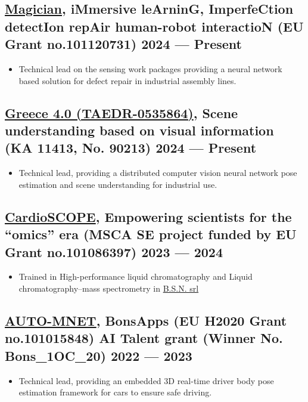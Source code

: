 \documentclass[a4,8pt]{article}
\newenvironment{zitemize}{
\begin{itemize}\itemsep0pt \parskip0pt \parsep1pt}
{\end{itemize}\vspace{-0.5cm}}
\begin{document}
\subsection*{\href{https://cordis.europa.eu/project/id/101120731}{Magician}, {\normalsize\normalfont iMmersive leArninG, ImperfeCtion detectIon repAir  human-robot interactioN (EU Grant no.101120731)} \hfill 2024 --- Present } 
    \begin{zitemize}
        \item Technical lead on the sensing work packages providing a neural network based solution for defect repair in industrial assembly lines.
    \end{zitemize}

\subsection*{\href{https://www.greece40.gr/}{Greece 4.0 (TAEDR-0535864)}, {\normalsize\normalfont Scene understanding based on visual information (KA 11413, No. 90213)} \hfill 2024 --- Present } 
    \begin{zitemize}
        \item Technical lead, providing a distributed computer vision neural network pose estimation and scene understanding for industrial use.
    \end{zitemize}

\subsection*{\href{https://cardio-scope.eu/}{CardioSCOPE}, {\normalsize\normalfont Empowering scientists for the “omics” era (MSCA SE project funded by EU Grant no.101086397)} \hfill 2023 --- 2024 } 
    \begin{zitemize}
            \item Trained in High-performance liquid chromatography and Liquid chromatography–mass spectrometry in \href{https://www.bsn-srl.it/en/}{B.S.N. srl} 
    \end{zitemize}

\subsection*{\href{https://gitlab.com/bonseyes/bonsapps/1st-support-programme/automotive/body-part-tracking/auto-mnet}{AUTO-MNET}, {\normalsize\normalfont BonsApps (EU H2020 Grant no.101015848) AI Talent grant (Winner No. Bons\_1OC\_20)} \hfill 2022 --- 2023 } 
    \begin{zitemize}
        \item Technical lead, providing an embedded 3D real-time driver body pose estimation framework for cars to ensure safe driving.  
    \end{zitemize}
\end{document}
